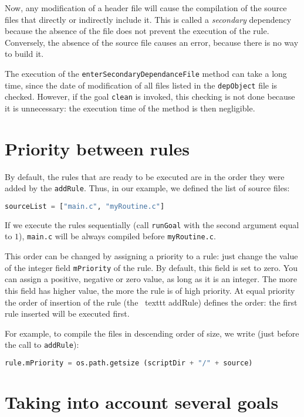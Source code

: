 \documentclass[a4paper,11pt]{extarticle}
\begin{document}
Now, any modification of a header file will cause the compilation of the source files that directly or indirectly include it. This is called a \emph{secondary} dependency because the absence of the file does not prevent the execution of the rule. Conversely, the absence of the source file causes an error, because there is no way to build it.

The execution of the \texttt{enterSecondaryDependanceFile} method can take a long time, since the date of modification of all files listed in the \texttt{depObject} file is checked. However, if the goal \texttt{clean} is invoked, this checking is not done because it is unnecessary: the execution time of the method is then negligible.


\section{Priority between rules}

By default, the rules that are ready to be executed are in the order they were added by the \texttt{addRule}. Thus, in our example, we defined the list of source files:
\begin{lstlisting}[language=py]
sourceList = ["main.c", "myRoutine.c"]
\end{lstlisting}
If we execute the rules sequentially (call \texttt{runGoal} with the second argument equal to $1$), \texttt{main.c} will be always compiled before \texttt{myRoutine.c}.

This order can be changed by assigning a priority to a rule: just change the value of the integer field \texttt{mPriority}  of the rule. By default, this field is set to zero. You can assign a positive, negative or zero value, as long as it is an integer. The more this field has higher value, the more the rule is of high priority. At equal priority the order of insertion of the rule (the \ texttt {} addRule) defines the order: the first rule inserted will be executed first.

For example, to compile the files in descending order of size, we write (just before the call to \texttt{addRule}):
\begin{lstlisting}[language=py]
  rule.mPriority = os.path.getsize (scriptDir + "/" + source)
\end{lstlisting}






\section{Taking into account several goals}
\end{document}
